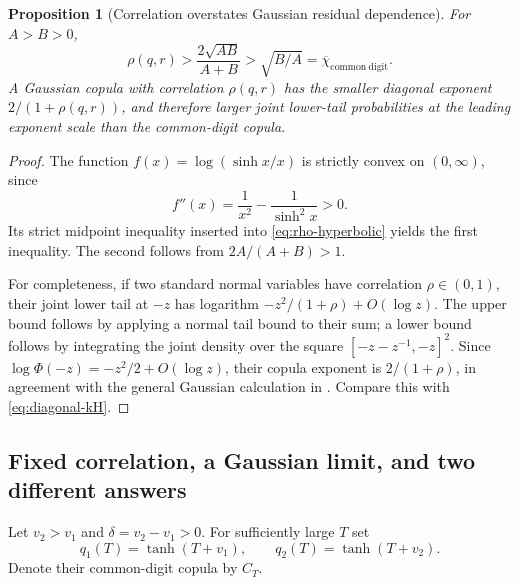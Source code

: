 \documentclass[11pt,a4paper]{article}
\newtheorem{proposition}[theorem]{Proposition}
\theoremstyle{definition}
\theoremstyle{remark}
\numberwithin{equation}{section}
\begin{document}
\begin{proposition}[Correlation overstates Gaussian residual dependence]
\label{prop:rho}
For $A>B>0$,
\begin{equation}
 \rho(q,r)>\frac{2\sqrt{AB}}{A+B}>\sqrt{B/A}
 =\overline\chi_{\mathrm{common\ digit}}.
 \label{eq:rho-inequality}
\end{equation}
A Gaussian copula with correlation $\rho(q,r)$ has the smaller diagonal
exponent $2/(1+\rho(q,r))$, and therefore larger joint lower-tail
probabilities at the leading exponent scale than the common-digit copula.
\end{proposition}
\begin{proof}
The function $f(x)=\log(\sinh x/x)$ is strictly convex on $(0,\infty)$,
since
\[
 f''(x)=\frac1{x^2}-\frac1{\sinh^2x}>0.
\]
Its strict midpoint inequality inserted into
\eqref{eq:rho-hyperbolic} yields the first inequality. The second follows
from $2A/(A+B)>1$.

For completeness, if two standard normal variables have correlation
$\rho\in(0,1)$, their joint lower tail at $-z$ has logarithm
$-z^2/(1+\rho)+O(\log z)$. The upper bound follows by applying a
normal tail bound to their sum; a lower bound follows by integrating the
joint density over the square $[-z-z^{-1},-z]^2$. Since
$\log\Phi(-z)=-z^2/2+O(\log z)$, their copula exponent is
$2/(1+\rho)$, in agreement with the general Gaussian calculation in
\cite{Tankov}. Compare this with \eqref{eq:diagonal-kH}.
\end{proof}

\subsection{Fixed correlation, a Gaussian limit, and two different answers}
Let $v_2>v_1$ and $\delta=v_2-v_1>0$. For sufficiently large $T$ set
\begin{equation}
 q_1(T)=\tanh(T+v_1),\qquad q_2(T)=\tanh(T+v_2).
 \label{eq:translate}
\end{equation}
Denote their common-digit copula by $C_T$.
\end{document}
